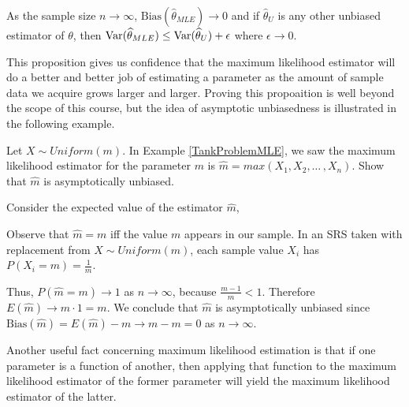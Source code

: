\begin{prop} As the sample size $n \to \infty$, $\text{Bias}(\widehat{\theta}_{MLE}) \to 0$ and if $\widehat{\theta}_{U}$ is any other unbiased estimator of $\theta$, then $\operatorname{Var}(\widehat{\theta}_{MLE}) \leq \operatorname{Var}(\widehat{\theta}_{U}) + \epsilon$ where $\epsilon \to 0$.
\end{prop}

This proposition gives us confidence that the maximum likelihood estimator will do a better and better job of estimating a parameter as the amount of sample data we acquire grows larger and larger. Proving this propoaition is well beyond the scope of this course, but the idea of asymptotic unbiasedness is illustrated in the following example.

\begin{examp} Let $X \sim Uniform(m)$. In Example \ref{TankProblemMLE}, we saw the maximum likelihood estimator for the parameter $m$ is $\widehat{m} = max(X_1,X_2,\dots\,,X_n)$. Show that $\widehat{m}$ is asymptotically unbiased.
\par
\noindent Consider the expected value of the estimator $\widehat{m}$,
\par
\noindent Observe that $\widehat{m} =  m$ iff the value $m$ appears in our sample. In an SRS taken with replacement from $X \sim Uniform(m)$, each sample value $X_i$ has $P(X_i = m) = \frac{1}{m}$.
\par
\noindent Thus, $P(\widehat{m} = m) \to 1$ as $n \to \infty$, because $\frac{m-1}{m} < 1$. Therefore $E(\widehat{m}) \to m \cdot 1 = m$. We conclude that $\widehat{m}$ is asymptotically unbiased since $\text{Bias}(\widehat{m}) = E(\widehat{m}) - m  \to m - m = 0$ as $n \to \infty$.
\end{examp}
\par
Another useful fact concerning maximum likelihood estimation is that if one parameter is a function of another, then applying that function to the maximum likelihood estimator of the former parameter will yield the maximum likelihood estimator of the latter.

